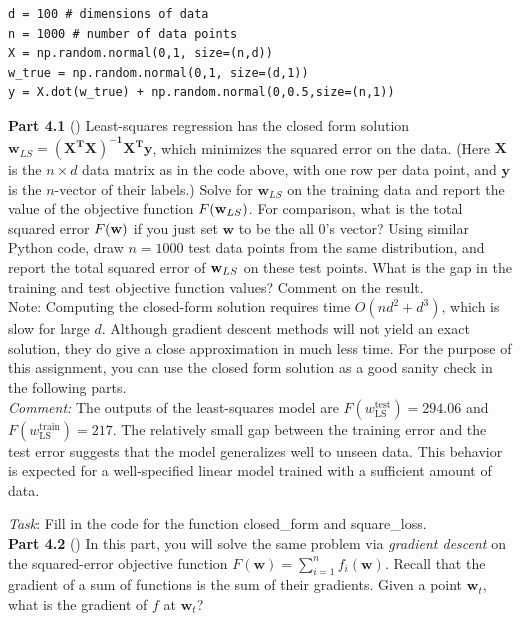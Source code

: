 \begin{verbatim}
d = 100 # dimensions of data
n = 1000 # number of data points
X = np.random.normal(0,1, size=(n,d))
w_true = np.random.normal(0,1, size=(d,1))
y = X.dot(w_true) + np.random.normal(0,0.5,size=(n,1))
\end{verbatim}

\textbf{Part 4.1} () Least-squares regression has the closed form solution $\textbf{w}_{LS} =
\mathbf{(X^TX)^{-1}X^Ty}$, which minimizes the squared error on the
data. 
(Here $\mathbf{X}$ is the $n \times d$ data matrix as in the code
above, with one row per data point, and $\mathbf{y}$ is the $n$-vector
of their labels.)
Solve for $\textbf{w}_{LS}$ on the training data and report the value of the objective function $F(\mathbf{w}_{LS})$.  For comparison, what is the 
total squared error $F(\mathbf{w})$ if you just set $\textbf{w}$ to be the all 0's vector? Using similar Python code, draw $n=1000$ test data points from the same distribution, and report the total squared error of $\mathbf{w}_{LS}$ on these test points. What is the gap in the training and test objective function values? Comment on the result. \\

Note: Computing the closed-form solution requires time
$O(nd^2 + d^3)$, which is slow for large $d$. Although gradient
descent methods will not yield an exact solution, they do give a
close approximation in much less time. For the purpose of this
assignment, you can use the closed form solution as a good sanity
check in the following parts.\\

\textit{Comment:} The outputs of the least-squares model are 
$F(w_{\text{LS}}^{\text{test}}) = 294.06$ and 
$F(w_{\text{LS}}^{\text{train}}) = 217$. 
The relatively small gap between the training error and the test error suggests that the model generalizes well to unseen data. 
This behavior is expected for a well-specified linear model trained with a sufficient amount of data.

\bigskip
\noindent \emph{Task}: Fill in the code for the function \colorbox{Gainsboro!60!Lavender}{closed\_form} and \colorbox{Gainsboro!60!Lavender}{square\_loss}. \\

\textbf{Part 4.2} () In this part, you will solve the same problem via
  \emph{gradient descent} on the squared-error objective function
  $F(\textbf{w})=\sum_{i=1}^n f_i(\textbf{w})$.  Recall that the gradient of a
  sum of functions is the sum of their gradients.  Given a point
  $\textbf{w}_t$, what is the gradient of $f$ at $\textbf{w}_t$?

